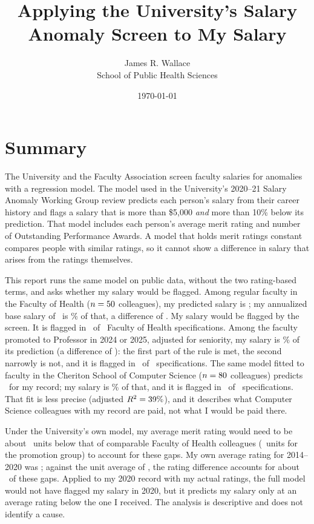 \documentclass{article}
\title{Applying the University's Salary Anomaly Screen to My Salary}
\author{James R. Wallace\\ School of Public Health Sciences}
\date{\today}
\begin{document}
\maketitle

\section*{Summary}

The University and the Faculty Association screen faculty salaries for anomalies with a regression model. The model used in the University's 2020--21 Salary Anomaly Working Group review predicts each person's salary from their career history and flags a salary that is more than \$5{,}000 \emph{and} more than 10\% below its prediction. That model includes each person's average merit rating and number of Outstanding Performance Awards. A model that holds merit ratings constant compares people with similar ratings, so it cannot show a difference in salary that arises from the ratings themselves.

This report runs the same model on public data, without the two rating-based terms, and asks whether my salary would be flagged. Among regular faculty in the Faculty of Health ($n = 50$ colleagues), my predicted salary is \OnemainFitted; my annualized base salary of \OnemainActual\ is \OnemainRatio\% of that, a difference of \OnemainGap. My salary would be flagged by the screen. It is flagged in \NFlagOne\ of \NSpecsOne\ Faculty of Health specifications. Among the faculty promoted to Professor in 2024 or 2025, adjusted for seniority, my salary is \TwomainRatio\% of its prediction (a difference of \TwomainGap): the first part of the rule is met, the second narrowly is not, and it is flagged in \NFlagTwo\ of \NSpecsTwo\ specifications. The same model fitted to faculty in the Cheriton School of Computer Science ($n = 80$ colleagues) predicts \CmainFitted\ for my record; my salary is \CmainRatio\% of that, and it is flagged in \NFlagC\ of \NSpecsC\ specifications. That fit is less precise (adjusted $R^2 = 39\%$), and it describes what Computer Science colleagues with my record are paid, not what I would be paid there.

Under the University's own model, my average merit rating would need to be about \OnemainBreakEven\ units below that of comparable Faculty of Health colleagues (\TwomainBreakEven\ units for the promotion group) to account for these gaps. My own average rating for 2014--2020 was \WRAvg; against the unit average of \WUnitMean, the rating difference accounts for about \WDeficitDollars\ of these gaps. Applied to my 2020 record with my actual ratings, the full model would not have flagged my salary in 2020, but it predicts my salary only at an average rating below the one I received. The analysis is descriptive and does not identify a cause.
\end{document}
